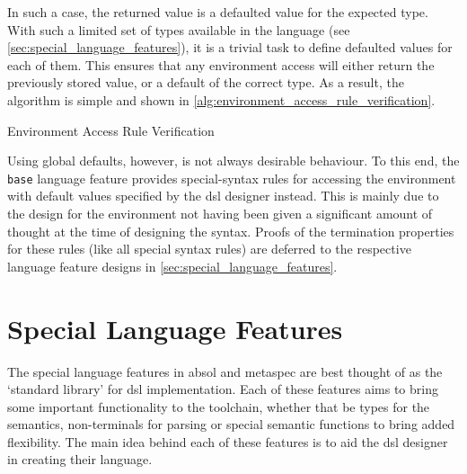 In such a case, the returned value is a defaulted value for the expected type.
With such a limited set of types available in the language (see \autoref{sec:special_language_features}), it is a trivial task to define defaulted values for each of them.
This ensures that any environment access will either return the previously stored value, or a default of the correct type. 
As a result, the algorithm is simple and shown in \autoref{alg:environment_access_rule_verification}.

\begin{algorithm}[!htb]
\begin{algorithmic}
    \State {}
\EndFunction
\end{algorithmic}
\caption{Environment Access Rule Verification}
\label{alg:environment_access_rule_verification}
\end{algorithm}

Using global defaults, however, is not always desirable behaviour. 
To this end, the \texttt{base} language feature provides special-syntax rules for accessing the environment with default values specified by the \gls{dsl} designer instead.
This is mainly due to the design for the environment not having been given a significant amount of thought at the time of designing the syntax.
Proofs of the termination properties for these rules (like all special syntax rules) are deferred to the respective language feature designs in \autoref{sec:special_language_features}.




\section{Special Language Features} %
\label{sec:special_language_features}

The special language features in \gls{absol} and \gls{metaspec} are best thought of as the `standard library' for \gls{dsl} implementation.
Each of these features aims to bring some important functionality to the toolchain, whether that be types for the semantics, non-terminals for parsing or special semantic functions to bring added flexibility. 
The main idea behind each of these features is to aid the \gls{dsl} designer in creating their language. \\

